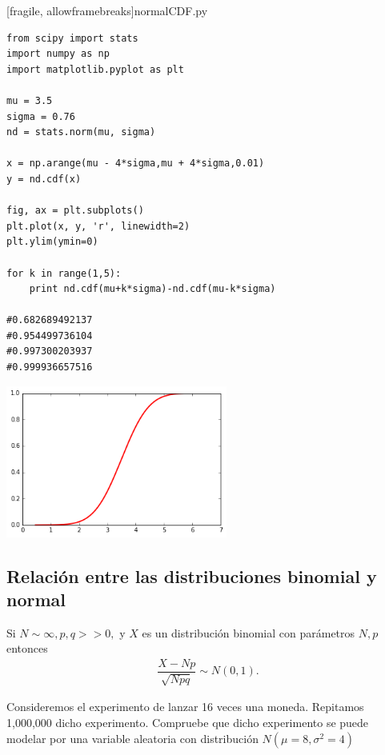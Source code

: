 [fragile, allowframebreaks]{normalCDF.py}
 \begin{verbatim}
from scipy import stats
import numpy as np
import matplotlib.pyplot as plt

mu = 3.5
sigma = 0.76
nd = stats.norm(mu, sigma)

x = np.arange(mu - 4*sigma,mu + 4*sigma,0.01)
y = nd.cdf(x)

fig, ax = plt.subplots()
plt.plot(x, y, 'r', linewidth=2)
plt.ylim(ymin=0)

for k in range(1,5):
    print nd.cdf(mu+k*sigma)-nd.cdf(mu-k*sigma)

#0.682689492137
#0.954499736104
#0.997300203937
#0.999936657516
 \end{verbatim}
\begin{center}
 \includegraphics[height=5cm,keepaspectratio=true]{./pe/normCDF.png}
\end{center}



\subsection{Relación entre las distribuciones binomial y normal}

 Si $N\sim \infty, p,q>>0,$ y $X$ es un distribución binomial con parámetros $N,p$ entonces
 \begin{align}
  \dfrac{X-Np}{\sqrt{Npq}} \sim N(0,1).
 \end{align}



 \begin{ejemplo}
  \label{exmp:7.5}
  Consideremos el experimento de lanzar 16 veces una moneda. Repitamos 1,000,000 dicho experimento. Compruebe que dicho experimento se puede modelar por una variable aleatoria con distribución $N(\mu=8,\sigma^{2}=4)$
 \end{ejemplo}


